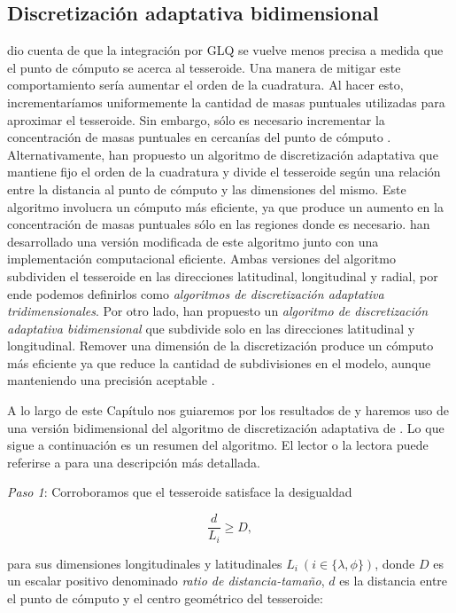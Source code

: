 \subsection{Discretización adaptativa bidimensional}

\citet{ku1977} dio cuenta de que la integración por \ac{GLQ} se vuelve menos
precisa a medida que el punto de cómputo se acerca al tesseroide.
Una manera de mitigar este comportamiento sería aumentar el orden de la
cuadratura.
Al hacer esto, incrementaríamos uniformemente la cantidad de masas puntuales
utilizadas para aproximar el tesseroide.
Sin embargo, sólo es necesario incrementar la concentración de masas puntuales
en cercanías del punto de cómputo \citep{uieda2016}.
Alternativamente,  \citet{li2011} han propuesto un algoritmo de discretización
adaptativa que mantiene fijo el orden de la cuadratura y divide el tesseroide
según una relación entre la distancia al punto de cómputo y las dimensiones
del mismo.
Este algoritmo involucra un cómputo más eficiente, ya que produce un aumento en
la concentración de masas puntuales sólo en las regiones donde es necesario.
\citet{uieda2016} han desarrollado una versión modificada de este
algoritmo junto con una implementación computacional eficiente.
Ambas versiones del algoritmo subdividen el tesseroide en las direcciones
latitudinal, longitudinal y radial, por ende podemos definirlos como
\emph{algoritmos de discretización adaptativa tridimensionales}.
Por otro lado, \citet{lin2019} han propuesto un \emph{algoritmo de
discretización adaptativa bidimensional} que subdivide solo en las direcciones
latitudinal y longitudinal.
Remover una dimensión de la discretización produce un cómputo más eficiente ya
que reduce la cantidad de subdivisiones en el modelo, aunque manteniendo una
precisión aceptable \citep{lin2019}.

A lo largo de este Capítulo nos guiaremos por los resultados de \citet{lin2019}
y haremos uso de una versión bidimensional del algoritmo de discretización
adaptativa de \citet{uieda2016}.
Lo que sigue a continuación es un resumen del algoritmo. El lector o la lectora
puede referirse a \citet{uieda2016} para una descripción más detallada.

\textit{Paso 1}: Corroboramos que el tesseroide satisface la
desigualdad

\begin{equation}
    \frac{d}{L_i} \geq D,
    \label{eq:condition}
\end{equation}

\noindent para sus dimensiones longitudinales y latitudinales
$L_i\ (i \in \{\lambda, \phi\})$,
donde $D$ es un escalar positivo denominado \emph{ratio de distancia-tamaño},
$d$ es la distancia entre el punto de cómputo y el centro geométrico del
tesseroide:

